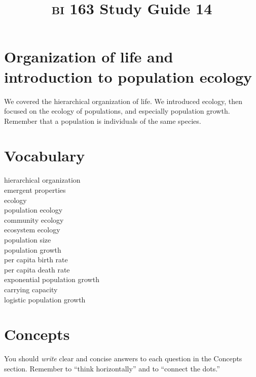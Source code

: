 \documentclass[letterpaper]{tufte-handout}
\title{{\scshape bi} 163 Study Guide 14}
\date{} %
\begin{document}
\maketitle	%

\section*{Organization of life and introduction to population ecology}

We covered the hierarchical organization of life. We introduced ecology, then focused on the ecology of populations, and especially population growth.  Remember that a population is individuals of the same species.

\section*{Vocabulary}

\vspace{-1\baselineskip}
\begin{multicols}{2}
hierarchical organization \\
emergent properties \\
ecology\\
population ecology\\
community ecology \\
ecosystem ecology \\
population size\\
population growth\\
per capita birth rate\\
per capita death rate\\
exponential population growth\\
carrying capacity\\
logistic population growth\\
\end{multicols}

\section*{Concepts}

You should \emph{write} clear and concise answers to each question in the Concepts section.  Remember to ``think horizontally'' and to ``connect the dots.'' 
\end{document}
